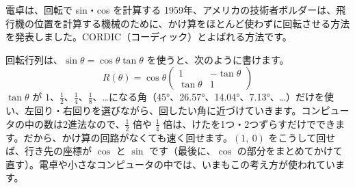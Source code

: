 \begin{column}{電卓は、回転で sin・cos を計算する}
1959年、アメリカの技術者ボルダーは、飛行機の位置を計算する機械のために、かけ算をほとんど使わずに回転させる方法を発表しました。CORDIC（コーディック）とよばれる方法です。
\par\vspace{3pt}
回転行列は、$\sin\theta=\cos\theta\tan\theta$ を使うと、次のように書けます。
\[R(\theta)=\cos\theta\begin{pmatrix}1&-\tan\theta\\\tan\theta&1\end{pmatrix}\]
$\tan\theta$ が $1$、$\frac12$、$\frac14$、$\frac18$、…になる角（45°、26.57°、14.04°、7.13°、…）だけを使い、左回り・右回りを選びながら、回したい角に近づけていきます。コンピュータの中の数は2進法なので、$\frac12$ 倍や $\frac14$ 倍は、けたを1つ・2つずらすだけでできます。だから、かけ算の回路がなくても速く回せます。$(1,\ 0)$ をこうして回せば、行き先の座標が $\cos$ と $\sin$ です（最後に、$\cos$ の部分をまとめてかけて直す）。電卓や小さなコンピュータの中では、いまもこの考え方が使われています。
\end{column}

